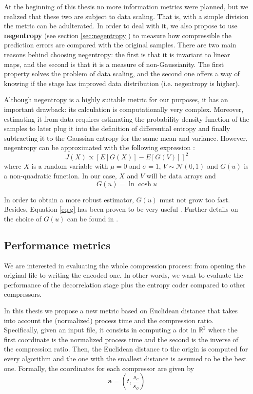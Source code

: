 At the beginning of this thesis no more information metrics were planned, but we realized that these two are subject to data scaling. That is, with a simple division the metric can be adulterated. In order to deal with it, we also propose to use \textbf{negentropy} (see section \ref{sec:negentropy}) to measure how compressible the prediction errors are compared with the original samples. There are two main reasons behind choosing negentropy: the first is that it is invariant to linear maps, and the second is that it is a measure of non-Gaussianity. The first property solves the problem of data scaling, and the second one offers a way of knowing if the stage has improved data distribution (i.e. negentropy is higher).

Although negentropy is a highly suitable metric for our purposes, it has an important drawback: its calculation is computationally very complex. Moreover, estimating it from data requires estimating the probability density function of the samples to later plug it into the definition of differential entropy and finally subtracting it to the Gaussian entropy for the same mean and variance. However, negentropy can be approximated with the following expression \parencite{HYVARINEN2000411}:
\begin{equation}
J(X) \propto \left[E[G(X)] - E[G(V)]\right]^2
\end{equation}
where $X$ is a random variable with $\mu = 0$ and $\sigma = 1$, $V \sim \mathscr{N}(0,1)$ and $G(u)$ is a non-quadratic function. In our case, $X$ and $V$ will be data arrays and
\begin{equation} \label{eq:g}
G(u) = \ln \cosh u
\end{equation}

In order to obtain a more robust estimator, $G(u)$ must not grow too fast. Besides, Equation \ref{eq:g} has been proven to be very useful \parencite{HYVARINEN2000411}. Further details on the choice of $G(u)$ can be found in \parencite{NIPS1997_6d9c547c}. 

\subsection{Performance metrics} \label{sec:euclidean}
We are interested in evaluating the whole compression process: from opening the original file to writing the encoded one. In other words, we want to evaluate the performance of the decorrelation stage plus the entropy coder compared to other compressors.

In this thesis we propose a new metric based on Euclidean distance that takes into account the (normalized) process time and the compression ratio. Specifically, given an input file, it consists in computing a dot in $\mathbb{R}^2$ where the first coordinate is the normalized process time and the second is the inverse of the compression ratio. Then, the Euclidean distance to the origin is computed for every algorithm and the one with the smallest distance is assumed to be the best one. Formally, the coordinates for each compressor are given by
\begin{equation} \label{eq:dot_comp}
\mathbf{a} = \left(t, \frac{s_c}{s_o}\right)
\end{equation}

